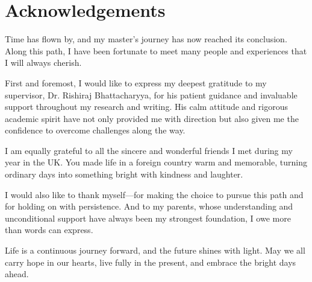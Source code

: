
\chapter*{Acknowledgements}

Time has flown by, and my master’s journey has now reached its conclusion. Along this path, I have been fortunate to meet many people and experiences that I will always cherish.

First and foremost, I would like to express my deepest gratitude to my supervisor, Dr. Rishiraj Bhattacharyya, for his patient guidance and invaluable support throughout my research and writing. His calm attitude and rigorous academic spirit have not only provided me with direction but also given me the confidence to overcome challenges along the way.

I am equally grateful to all the sincere and wonderful friends I met during my year in the UK. You made life in a foreign country warm and memorable, turning ordinary days into something bright with kindness and laughter.

I would also like to thank myself—for making the choice to pursue this path and for holding on with persistence. And to my parents, whose understanding and unconditional support have always been my strongest foundation, I owe more than words can express.

Life is a continuous journey forward, and the future shines with light. May we all carry hope in our hearts, live fully in the present, and embrace the bright days ahead.